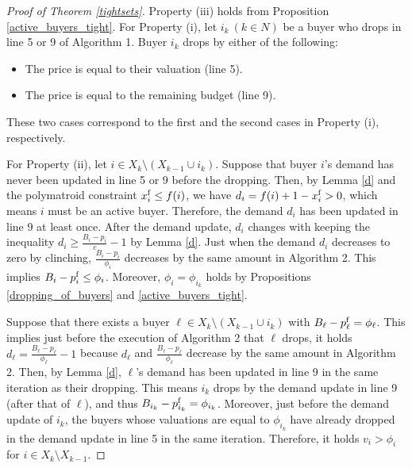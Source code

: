 \documentclass[letterpaper,11pt]{article}
\begin{document}
\begin{proof}[Proof of Theorem \ref{tightsets}]
Property (iii) holds from Proposition \ref{active_buyers_tight}.
For Property (i), let $i_k\ (k\in N)$ be a buyer who drops in line 5 or 9 of Algorithm 1.
Buyer $i_k$ drops by either of the following:
\begin{itemize}
\item The price is equal to their valuation (line 5).
\item The price is equal to the remaining budget (line 9). 
\end{itemize}
These two cases correspond to the first and the second cases in Property (i), respectively.

For Property (ii), let $i\in X_{k}\setminus (X_{k-1}\cup i_k)$.
Suppose that buyer $i$'s demand has never been updated in line 5 or 9 before the dropping.
Then, by Lemma \ref{d} and the polymatroid constraint $x^{\rm f}_i\leq f(i)$, 
we have $d_i=f(i)+1-x^{\rm f}_i>0$, 
which means $i$ must be an active buyer.
Therefore, the demand $d_i$ has been updated in line 9 at least once. 
After the demand update, $d_i$ changes with keeping the inequality 
$d_i\geq \frac{B_i-p_i}{c}-1$ by Lemma \ref{d}.
Just when the demand $d_i$ decreases to zero by clinching, 
$\frac{B_i-p_i}{\phi_i}$ decreases by the same amount in Algorithm 2.
This implies $B_i-p^{\rm f}_i\leq\phi_i$.
Moreover, $\phi_i=\phi_{i_k}$ holds by Propositions \ref{dropping_of_buyers} and \ref{active_buyers_tight}.

Suppose that there exists a buyer $\ell \in X_k\setminus (X_{k-1}\cup i_k)$ 
with $B_{\ell}-p^{\rm f}_{\ell}=\phi_{\ell}$.
This implies just before the execution of Algorithm 2 that $\ell$ drops, 
it holds $d_{\ell}=\frac{B_{\ell}-p_{\ell}}{\phi_{\ell}}-1$ because 
$d_{\ell}$ and $\frac{B_{\ell}-p_{\ell}}{\phi_{\ell}}$ decrease by the same amount in Algorithm 2.
Then, by Lemma \ref{d}, $\ell$'s demand has been updated in line 9 in the same iteration as their dropping. 
This means $i_{k}$ drops by the demand update in line 9 (after that of $\ell$), 
and thus $B_{i_{k}}-p^{\rm f}_{i_{k}}=\phi_{i_{k}}$.
Moreover, just before the demand update of $i_k$, the buyers whose valuations are equal to $\phi_{i_k}$ 
have already dropped in the demand update in line 5 in the same iteration.
Therefore, it holds $v_i>\phi_i$ for $i\in X_k\setminus X_{k-1}$. 
\end{proof}

\end{document}
